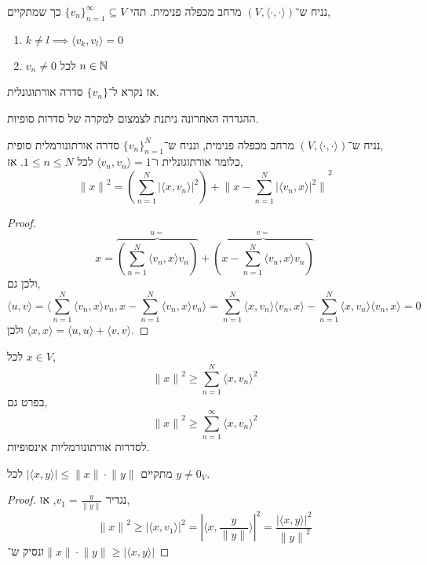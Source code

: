 \begin{definition}
	נניח ש־$(V, \langle \cdot, \cdot \rangle)$ מרחב מכפלה פנימית.
	תהי ${\{ v_n \}}_{n = 1}^\infty \subseteq V$ כך שמתקיים,
	\begin{enumerate}
		\item $k \ne l \implies \langle v_k, v_l \rangle = 0$
		\item $v_n \ne 0$ לכל $n \in \mathbb{N}$
	\end{enumerate}
	אז נקרא ל־$\{ v_n \}$ סדרה אורתוגונלית.
\end{definition}
\begin{remark}
	ההגדרה האחרונה ניתנת לצמצום למקרה של סדרות סופיות.
\end{remark}
\begin{theorem}[הפיתגורי]
	נניח ש־$(V, \langle \cdot, \cdot \rangle)$ מרחב מכפלה פנימית,
	ונניח ש־${\{ v_n \}}_{n = 1}^N$ סדרה אורתונורמלית סופית, \\
	כלומר אורתוגונלית ו־$\langle v_n, v_n \rangle = 1$ לכל $1 \le n \le N$.
	אז,
	\[
		{\lVert x \rVert}^2
		= \left( \sum_{n = 1}^N {|\langle x, v_n \rangle|}^2 \right) + {\lVert x - \sum_{n = 1}^N {|\langle v_n, x \rangle|}^2 \rVert}^2
	\]
\end{theorem}
\begin{proof}
	\[
		x = \overbrace{\left( \sum_{n = 1}^N \langle v_n, x \rangle v_n \right)}^{u = } + \overbrace{\left( x - \sum_{n = 1}^N \langle v_n, x \rangle v_n \right)}^{v = }
	\]
	ולכן גם,
	\[
		\langle u, v \rangle
		= \langle \sum_{n = 1}^N \langle v_n, x \rangle v_n, x - \sum_{n = 1}^N \langle v_n, x \rangle v_n \rangle
		= \sum_{n = 1}^N \langle x, v_n \rangle \langle v_n, x \rangle - \sum_{n = 1}^N \langle x, v_n \rangle \langle v_n, x \rangle
		= 0
	\]
	ולכן $\langle x, x \rangle = \langle u, u \rangle + \langle v, v \rangle$.
\end{proof}
\begin{corollary}
	לכל $x \in V$,
	\[
		{\lVert x \rVert}^2
		\ge \sum_{n = 1}^N {\langle x, v_n \rangle}^2
	\]
	בפרט גם,
	\[
		{\lVert x \rVert}^2
		\ge \sum_{n = 1}^\infty {\langle x, v_n \rangle}^2
	\]
	לסדרות אורתונורמליות אינסופיות.
\end{corollary}
\begin{corollary}
	מתקיים $|\langle x, y \rangle| \le \lVert x \rVert \cdot \lVert y \rVert$ לכל $y \ne 0_V$.
\end{corollary}
\begin{proof}
	נגדיר $v_1 = \frac{y}{\lVert y \rVert}$, אז,
	\[
		{\lVert x \rVert}^2
		\ge {|\langle x, v_1 \rangle|}^2
		= {\left\lvert \langle x, \frac{y}{\lVert y \rVert} \rangle\right\rvert}^2
		= \frac{{|\langle x, y \rangle|}^2}{{\lVert y \rVert}^2}
	\]
	ונסיק ש־$\lVert x \rVert \cdot \lVert y \rVert \ge |\langle x, y \rangle|$
\end{proof}
